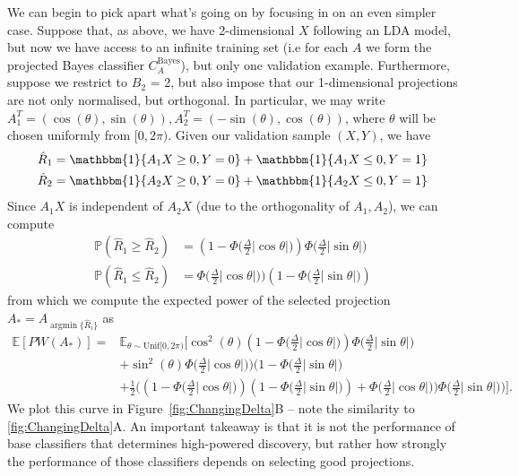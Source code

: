 \documentclass[12pt]{article}
\DeclareMathOperator*{\argmin}{argmin}
\begin{document}
We can begin to pick apart what's going on by focusing in on an even simpler case. Suppose that, as above, we have 2-dimensional $X$ following an LDA model, but now we have access to an infinite training set (i.e for each $A$ we form the projected Bayes classifier $C_A^{\text{Bayes}}$), but only one validation example. Furthermore, suppose we restrict to $B_2$ = 2, but also impose that our 1-dimensional projections are not only normalised, but orthogonal. In particular, we may write $A_1^T = (\cos(\theta), \sin(\theta)), A_2^T = (-\sin(\theta), \cos(\theta))$, where $\theta$ will be chosen uniformly from $[0, 2\pi)$. Given our validation sample $(X, Y)$, we have
\begin{align*}
    \hat{R}_1 & = \mathbbm{1}\{ A_1X \geq 0, Y = 0 \} + \mathbbm{1}\{ A_1X \leq 0, Y = 1 \} \\
    \hat{R}_2 & = \mathbbm{1}\{ A_2X \geq 0, Y = 0 \} + \mathbbm{1}\{ A_2X \leq 0, Y = 1 \}
\end{align*}
Since $A_1X$ is independent of $A_2X$ (due to the orthogonality of $A_1, A_2$), we can compute 
\begin{align*}
    \mathbb{P}(\hat{R}_1 \geq \hat{R}_2) & = (1 - \Phi\big(\frac{\Delta}{2}|\cos\theta|\big))\Phi\big(\frac{\Delta}{2}|\sin\theta|\big) \\
    \mathbb{P}(\hat{R}_1 \leq \hat{R}_2) & = \Phi\big(\frac{\Delta}{2}|\cos\theta|\big))(1-\Phi\big(\frac{\Delta}{2}|\sin\theta|\big)) %
\end{align*}
from which we compute the expected power of the selected projection $A_* = A_{\argmin \{ \hat{R}_i\}}$ as 
\begin{align*}
\mathbb{E}[PW(A_*)] = & \mathbb{E}_{\theta \sim \text{Unif}[0, 2\pi)}[\cos^2(\theta) (1 - \Phi\big(\frac{\Delta}{2}|\cos\theta|\big))\Phi\big(\frac{\Delta}{2}|\sin\theta|\big)\\ 
 &+ \sin^2(\theta) \Phi\big(\frac{\Delta}{2}|\cos\theta|\big))(1-\Phi\big(\frac{\Delta}{2}|\sin\theta|\big) \\
 &+ \frac{1}{2} \Big( (1 - \Phi\big(\frac{\Delta}{2}|\cos\theta|\big))(1-\Phi\big(\frac{\Delta}{2}|\sin\theta|\big)) + 
    \Phi\big(\frac{\Delta}{2}|\cos\theta|\big))\Phi\big(\frac{\Delta}{2}|\sin\theta|\big) \Big)].  
    \end{align*}
We plot this curve in Figure~\ref{fig:ChangingDelta}B -- note the similarity to \ref{fig:ChangingDelta}A. An important takeaway is that it is not the performance of base classifiers that determines high-powered discovery, but rather how strongly the performance of those classifiers depends on selecting good projections.
\end{document}
